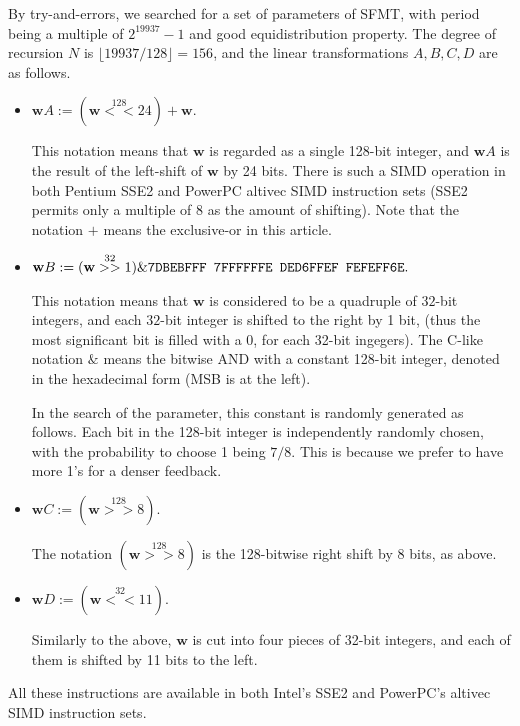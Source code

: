 \documentclass[acmnow]{acmtrans2m}
\def\bw{{{\mathbf w}}}
\begin{document}
By try-and-errors, 
we searched for a set of parameters of SFMT,
with period being a multiple of $2^{19937}-1$
and good equidistribution property.
The degree of recursion $N$ is $\lfloor 19937/128 \rfloor=156$, 
and the linear transformations $A,B,C,D$ are as follows.
\begin{itemize}
\item 
$\bw A := (\bw \stackrel{128}{<<} 24) + \bw.$

This notation means that $\bw$ is regarded
as a single 128-bit integer, and 
$\bw A$ is the result of the left-shift
of $\bw$ by 24 bits. There is such a SIMD operation
in both Pentium SSE2 and PowerPC altivec SIMD instruction 
sets (SSE2 permits only a multiple of 8
as the amount of shifting). 
Note that the notation $+$ means the exclusive-or
in this article.

\item
$\bw B := (\bw \stackrel{32}{>>} 1) \& \mbox{\tt 7DBEBFFF 7FFFFFFE DED6FFEF FEFEFF6E}.$

This notation means that $\bw$ is considered to be 
a quadruple of $32$-bit integers, and
each $32$-bit integer is shifted to the right by 1 bit,
(thus the most significant bit is filled with a 0, 
for each 32-bit ingegers).
The C-like notation $\&$ means the bitwise AND
with a constant 128-bit integer,
denoted in the hexadecimal form
(MSB is at the left). 

In the search of the parameter, 
this constant is randomly generated as follows. 
Each bit in the 128-bit integer is independently 
randomly chosen, with the probability to choose 1 being $7/8$.
This is because we prefer to have more 1's for a denser 
feedback.

\item 
$\bw C := (\bw \stackrel{128}{>>} 8).$

The notation 
$(\bw \stackrel{128}{>>} 8)$ is the 128-bitwise right shift 
by 8 bits, as above.

\item
$\bw D := (\bw \stackrel{32}{<<} 11).$

Similarly to the above,
$\bw$ is cut into four pieces of 32-bit integers,
and each of them is shifted by 11 bits to the left.
\end{itemize}
All these instructions are available in 
both Intel's SSE2 and PowerPC's altivec SIMD instruction sets.
\end{document}
